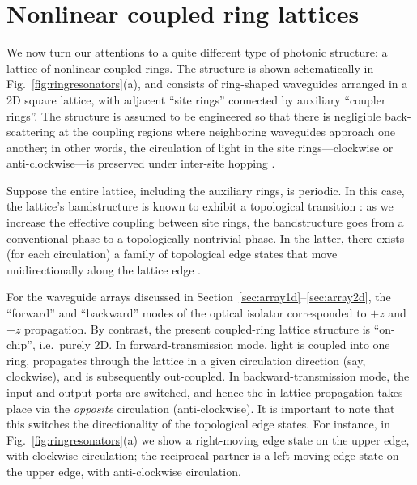 \documentclass[aps,prx,twocolumn,superscriptaddress]{revtex4-1}
\begin{document}
\section{Nonlinear coupled ring lattices}

We now turn our attentions to a quite different type of photonic structure: a lattice of nonlinear coupled rings.  The structure is shown schematically in Fig.~\ref{fig:ringresonators}(a), and consists of ring-shaped waveguides arranged in a 2D square lattice, with adjacent ``site rings'' connected by auxiliary ``coupler rings''.  The structure is assumed to be engineered so that there is negligible back-scattering at the coupling regions where  neighboring waveguides approach one another; in other words, the circulation of light in the site rings---clockwise or anti-clockwise---is preserved under inter-site hopping \cite{hafezi2011nphy,hafezi2014}.  

Suppose the entire lattice, including the auxiliary rings, is periodic.  In this case, the lattice's bandstructure is known to exhibit a topological transition \cite{liang2013}: as we increase the effective coupling between site rings, the bandstructure goes from a conventional phase to a topologically nontrivial phase.  In the latter, there exists (for each circulation) a family of topological edge states that move unidirectionally along the lattice edge \cite{liang2013,liang2014,Pasek2014,Hu2015,Fei2016}.

For the waveguide arrays discussed in Section~\ref{sec:array1d}--\ref{sec:array2d}, the ``forward'' and ``backward'' modes of the optical isolator corresponded to $+z$ and $-z$ propagation.  By contrast, the present coupled-ring lattice structure is ``on-chip'', i.e.~purely 2D.  In forward-transmission mode, light is coupled into one ring, propagates through the lattice in a given circulation direction (say, clockwise), and is subsequently out-coupled.  In backward-transmission mode, the input and output ports are switched, and hence the in-lattice propagation takes place via the \textit{opposite} circulation (anti-clockwise).  It is important to note that this switches the directionality of the topological edge states.  For instance, in Fig.~\ref{fig:ringresonators}(a) we show a right-moving edge state on the upper edge, with clockwise circulation; the reciprocal partner is a left-moving edge state on the upper edge, with anti-clockwise circulation.
\end{document}
